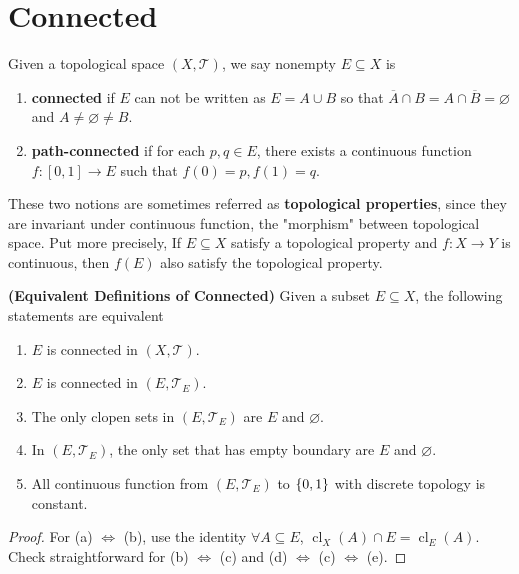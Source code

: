 \documentclass{report}
\begin{document}
\section{Connected}
\begin{abstract}

\end{abstract}
\begin{mdframed}
Given a topological space $(X,\mathscr{T })$, we say nonempty $E\subseteq X$ is  
\begin{enumerate}[label=(\alph*)]
    \item \textbf{connected} if $E$ can not be written as $E = A \cup B$ so that $\overline{A} \cap B = A \cap \overline{B} = \varnothing$ and $A \neq \varnothing \neq B$.
    \item \textbf{path-connected} if for each $p, q \in E$, there exists a continuous function $f : [0, 1] \to E$ such that $f(0) = p, f(1) = q$.
\end{enumerate}
These two notions are sometimes referred as \textbf{topological properties}, since they are invariant under continuous function, the "morphism" between topological space. Put more precisely, If $E \subseteq X$ satisfy a topological property and $f : X \to Y$ is continuous, then $f(E)$ also satisfy the topological property.
\end{mdframed}
\begin{theorem}
\label{Equivalent Definitions of Connected} 
\textbf{(Equivalent Definitions of Connected)} Given a subset $E\subseteq X$, the following statements are equivalent
\begin{enumerate}[label=(\alph*)]
    \item $E$ is connected in $(X, \mathscr{T})$.
    \item $E$ is connected in $(E, \mathscr{T}_E)$.
    \item The only clopen sets in $(E, \mathscr{T}_E)$ are $E$ and $\varnothing$.
    \item In $(E, \mathscr{T}_E)$, the only set that has empty boundary are $E$ and $\varnothing$.
    \item All continuous function from $(E, \mathscr{T}_E)$ to $\{ 0, 1 \}$ with discrete topology is constant.
\end{enumerate}
\end{theorem}
\begin{proof}
For (a) $\iff$ (b), use the identity $\forall A \subseteq E$, $\operatorname{cl}_X(A) \cap E = \operatorname{cl}_E(A)$. Check straightforward for (b) $\iff$ (c) and (d) $\iff$ (c) $\iff$ (e).
\end{proof}
\end{document}
